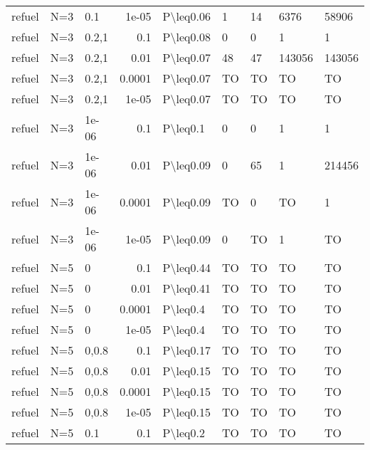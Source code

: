\begin{longtable}{lllrlllll}
 refuel        & N=3       & 0.1   & 1e-05  & P\textbackslash{}leq0.06  & 1    & 14   & 6376     & 58906   \\
 refuel        & N=3       & 0.2,1 & 0.1    & P\textbackslash{}leq0.08  & 0    & 0    & 1        & 1       \\
 refuel        & N=3       & 0.2,1 & 0.01   & P\textbackslash{}leq0.07  & 48   & 47   & 143056   & 143056  \\
 refuel        & N=3       & 0.2,1 & 0.0001 & P\textbackslash{}leq0.07  & TO   & TO   & TO       & TO      \\
 refuel        & N=3       & 0.2,1 & 1e-05  & P\textbackslash{}leq0.07  & TO   & TO   & TO       & TO      \\
 refuel        & N=3       & 1e-06 & 0.1    & P\textbackslash{}leq0.1   & 0    & 0    & 1        & 1       \\
 refuel        & N=3       & 1e-06 & 0.01   & P\textbackslash{}leq0.09  & 0    & 65   & 1        & 214456  \\
 refuel        & N=3       & 1e-06 & 0.0001 & P\textbackslash{}leq0.09  & TO   & 0    & TO       & 1       \\
 refuel        & N=3       & 1e-06 & 1e-05  & P\textbackslash{}leq0.09  & 0    & TO   & 1        & TO      \\
 refuel        & N=5       & 0     & 0.1    & P\textbackslash{}leq0.44  & TO   & TO   & TO       & TO      \\
 refuel        & N=5       & 0     & 0.01   & P\textbackslash{}leq0.41  & TO   & TO   & TO       & TO      \\
 refuel        & N=5       & 0     & 0.0001 & P\textbackslash{}leq0.4   & TO   & TO   & TO       & TO      \\
 refuel        & N=5       & 0     & 1e-05  & P\textbackslash{}leq0.4   & TO   & TO   & TO       & TO      \\
 refuel        & N=5       & 0,0.8 & 0.1    & P\textbackslash{}leq0.17  & TO   & TO   & TO       & TO      \\
 refuel        & N=5       & 0,0.8 & 0.01   & P\textbackslash{}leq0.15  & TO   & TO   & TO       & TO      \\
 refuel        & N=5       & 0,0.8 & 0.0001 & P\textbackslash{}leq0.15  & TO   & TO   & TO       & TO      \\
 refuel        & N=5       & 0,0.8 & 1e-05  & P\textbackslash{}leq0.15  & TO   & TO   & TO       & TO      \\
 refuel        & N=5       & 0.1   & 0.1    & P\textbackslash{}leq0.2   & TO   & TO   & TO       & TO      \\

\end{longtable}
